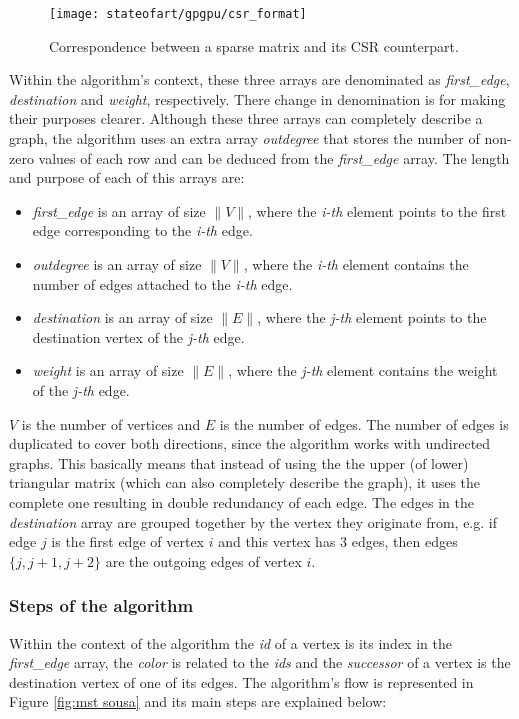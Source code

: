 \begin{figure}[hbtp]
\centering
\texttt{[image: stateofart/gpgpu/csr\_format]}
\caption{Correspondence between a sparse matrix and its CSR counterpart.}
\label{fig:csr}
\end{figure}

Within the algorithm's context, these three arrays are denominated as \emph{first\_edge}, \emph{destination} and \emph{weight}, respectively.
There change in denomination is for making their purposes clearer.
Although these three arrays can completely describe a graph, the algorithm uses an extra array \emph{outdegree} that stores the number of non-zero values of each row and can be deduced from the \emph{first\_edge} array.
The length and purpose of each of this arrays are:
\begin{itemize}
	\item \emph{first\_edge} is an array of size $\|V\|$, where the \emph{i-th} element points to the first edge corresponding to the \emph{i-th} edge.
	\item \emph{outdegree} is an array of size $\|V\|$, where the \emph{i-th} element contains the number of edges attached to the \emph{i-th} edge.
	\item \emph{destination} is an array of size $\|E\|$, where the \emph{j-th} element points to the destination vertex of the \emph{j-th} edge.
	\item \emph{weight} is an array of size $\|E\|$, where the \emph{j-th} element contains the weight of the \emph{j-th} edge.
\end{itemize}

$V$ is the number of vertices and $E$ is the number of edges.
The number of edges is duplicated to cover both directions, since the algorithm works with undirected graphs.
This basically means that instead of using the the upper (of lower) triangular matrix (which can also completely describe the graph), it uses the complete one resulting in double redundancy of each edge.
The edges in the \emph{destination} array are grouped together by the vertex they originate from, e.g. if edge $j$ is the first edge of vertex $i$ and this vertex has 3 edges, then edges $\{j,j+1,j+2\}$ are the outgoing edges of vertex $i$.

\subsubsection{Steps of the algorithm}

Within the context of the algorithm the \emph{id} of a vertex is its index in the \emph{first\_edge} array, the \emph{color} is related to the \emph{ids} and the \emph{successor} of a vertex is the destination vertex of one of its edges. The algorithm's flow is represented in Figure \ref{fig:mst sousa} and its main steps are explained below:


